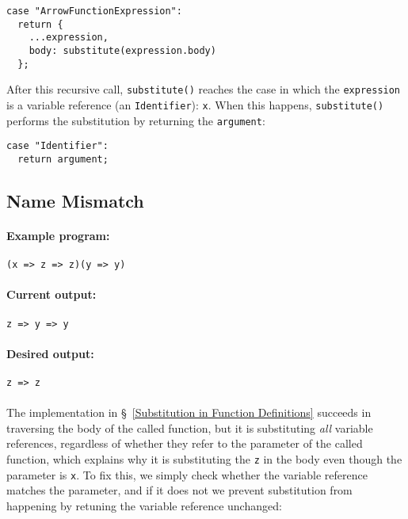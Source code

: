 \documentclass[12pt, oneside]{book}
\begin{document}
\begin{verbatim}
case "ArrowFunctionExpression":
  return {
    ...expression,
    body: substitute(expression.body)
  };
\end{verbatim}

After this recursive call, \texttt{substitute()} reaches the case in which the \texttt{expression} is a variable reference (an \texttt{Identifier}): \texttt{x}. When this happens, \texttt{substitute()} performs the substitution by returning the \texttt{argument}:

\begin{verbatim}
case "Identifier":
  return argument;
\end{verbatim}

\subsection{Name Mismatch}

\paragraph{Example program:}

\begin{verbatim}
(x => z => z)(y => y)
\end{verbatim}

\paragraph{Current output:}

\begin{verbatim}
z => y => y
\end{verbatim}

\paragraph{Desired output:}

\begin{verbatim}
z => z
\end{verbatim}

\paragraph{}

The implementation in §~\ref{Substitution in Function Definitions} succeeds in traversing the body of the called function, but it is substituting \emph{all} variable references, regardless of whether they refer to the parameter of the called function, which explains why it is substituting the \texttt{z} in the body even though the parameter is \texttt{x}. To fix this, we simply check whether the variable reference matches the parameter, and if it does not we prevent substitution from happening by retuning the variable reference unchanged:
\end{document}
